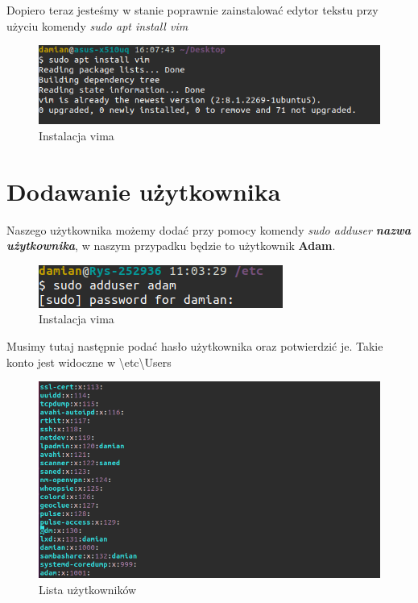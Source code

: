 \documentclass{article}
\begin{document}
Dopiero teraz jesteśmy w stanie poprawnie zainstalować edytor
tekstu przy użyciu komendy \textit{sudo apt install vim}

\begin{figure}[H]
    \centering
    
    \includegraphics[totalheight=3cm]{data/installVim.png}
    \caption{Instalacja vima}
    \label{2}
\end{figure}


\section{Dodawanie użytkownika}
Naszego użytkownika możemy dodać przy pomocy komendy 
\textit{sudo adduser \textbf{nazwa użytkownika}}, w naszym przypadku będzie to 
użytkownik \textbf{Adam}.

\begin{figure}[H]
    \centering
    \includegraphics[totalheight=2cm]{data/userAdd.png}
    \caption{Instalacja vima}
    \label{2}
\end{figure}
Musimy tutaj następnie podać hasło użytkownika oraz potwierdzić je.
Takie konto jest widoczne w  \textbackslash etc\textbackslash Users 

\begin{figure}[H]
    \centering
    \includegraphics[totalheight=7cm]{data/AdamAddD.png}
    \caption{Lista użytkowników}
    \label{2}
\end{figure}
\end{document}
